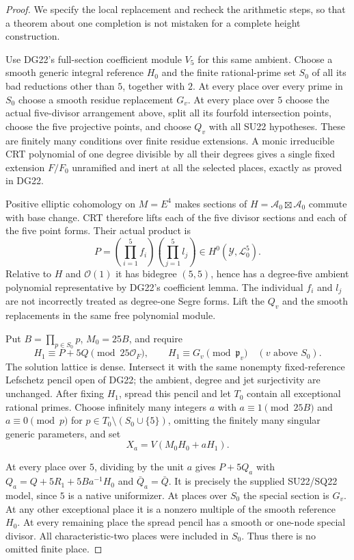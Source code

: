 \begin{proof}
We specify the local replacement and recheck the arithmetic
steps, so that a theorem about one completion is not
mistaken for a complete height construction.

Use DG22's full-section coefficient module $V_5$ for this
same ambient.  Choose a smooth generic integral reference
$H_0$ and the finite rational-prime set $S_0$ of all its
bad reductions other than $5$, together with $2$.
At every place over every prime in $S_0$ choose a smooth
residue replacement $G_v$.  At every place over $5$ choose
the actual five-divisor arrangement above, split all its
fourfold intersection points, choose the five projective
points, and choose $Q_v$ with all SU22 hypotheses.  These
are finitely many conditions over finite residue
extensions.  A monic irreducible CRT polynomial of one
degree divisible by all their degrees gives a single
fixed extension $F/F_0$ unramified and inert at all the
selected places, exactly as proved in DG22.

Positive elliptic cohomology on $M=E^4$ makes sections
of $H=\mathcal A_0\boxtimes\mathcal A_0$ commute with
base change.  CRT therefore lifts each of the five
divisor sections and each of the five point forms.
Their actual product is
\[
 P=(\prod_{i=1}^5 f_i)(\prod_{j=1}^5l_j)
                 \in H^0(\mathcal Y,\mathcal L_0^5).
 \tag{SQ22.12}\label{r22sq:globalP}
\]
Relative to $H$ and $\mathcal O(1)$ it has bidegree
$(5,5)$, hence has a degree-five ambient polynomial
representative by DG22's coefficient lemma.  The
individual $f_i$ and $l_j$ are not incorrectly treated
as degree-one Segre forms.  Lift the $Q_v$ and the
smooth replacements in the same free polynomial module.

Put $B=\prod_{p\in S_0}p$, $M_0=25B$, and require
\[
 H_1\equiv P+5Q\pmod{25\mathcal O_F},\qquad
 H_1\equiv G_v\pmod{\mathfrak p_v}\quad(v\text{ above }S_0).
 \tag{SQ22.13}\label{r22sq:H1}
\]
The solution lattice is dense.  Intersect it with the
same nonempty fixed-reference Lefschetz pencil open of
DG22; the ambient, degree and jet surjectivity are
unchanged.  After fixing $H_1$, spread this pencil and
let $T_0$ contain all exceptional rational primes.
Choose infinitely many integers $a$ with
$a\equiv1\pmod{25B}$ and $a\equiv0\pmod p$ for
$p\in T_0\setminus(S_0\cup\{5\})$, omitting the
finitely many singular generic parameters, and set
\[
                            X_a=V(M_0H_0+aH_1).
 \tag{SQ22.14}\label{r22sq:Xa}
\]

At every place over $5$, dividing by the unit $a$
gives $P+5Q_a$ with
$Q_a=Q+5R_1+5B a^{-1}H_0$ and $\bar Q_a=\bar Q$.
It is precisely the supplied SU22/SQ22 model, since
$5$ is a native uniformizer.  At places over $S_0$ the
special section is $G_v$.  At any other exceptional
place it is a nonzero multiple of the smooth reference
$H_0$.  At every remaining place the spread pencil
has a smooth or one-node special divisor.  All
characteristic-two places were included in $S_0$.
Thus there is no omitted finite place.


\end{proof}
